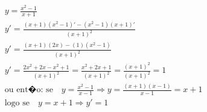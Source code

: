 \begin{ex}
\begin{align}
&y=\frac{x^2-1}{x+1}\nonumber\\
&y'=\frac{(x+1)(x^2-1)'-(x^2-1)(x+1)'}{(x+1)^2}\nonumber\\
&y'=\frac{(x+1)(2x)-(1)(x^2-1)}{(x+1)^2}\nonumber\\
&y'=\frac{2x^2+2x-x^2+1}{(x+1)^2}=\frac{x^2+2x+1}{(x+1)^2}=\frac{(x+1)^2}{(x+1)^2}=1\nonumber\\
&\text{ou ent�o: se}\quad y=\frac{x^2-1}{x-1} \Rightarrow y=\frac{(x+1)(x-1)}{x-1}=x+1\nonumber\\
&\text{logo se}\quad y=x+1 \Rightarrow y'=1\nonumber
\end{align}
\end{ex}
